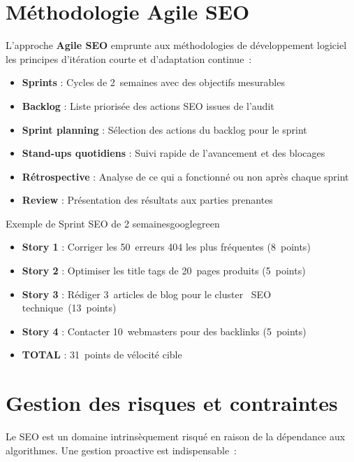 \documentclass[12pt,a4paper,twoside]{report}
\newcommand{\keyword}[1]{\textbf{\textcolor{googleblue}{#1}}}
\begin{document}
\section{Méthodologie Agile SEO}

L'approche \keyword{Agile SEO} emprunte aux méthodologies de développement logiciel les principes d'itération courte et d'adaptation continue~:

\begin{itemize}
    \item \textbf{Sprints} : Cycles de 2~semaines avec des objectifs mesurables
    \item \textbf{Backlog} : Liste priorisée des actions SEO issues de l'audit
    \item \textbf{Sprint planning} : Sélection des actions du backlog pour le sprint
    \item \textbf{Stand-ups quotidiens} : Suivi rapide de l'avancement et des blocages
    \item \textbf{Rétrospective} : Analyse de ce qui a fonctionné ou non après chaque sprint
    \item \textbf{Review} : Présentation des résultats aux parties prenantes
\end{itemize}

\begin{mybox}{Exemple de Sprint SEO de 2 semaines}{googlegreen}
\begin{itemize}
    \item \textbf{Story 1} : Corriger les 50~erreurs 404 les plus fréquentes (8~points)
    \item \textbf{Story 2} : Optimiser les title tags de 20~pages produits (5~points)
    \item \textbf{Story 3} : Rédiger 3~articles de blog pour le cluster \guillemotleft~SEO technique~\guillemotright (13~points)
    \item \textbf{Story 4} : Contacter 10~webmasters pour des backlinks (5~points)
    \item \textbf{TOTAL} : 31~points de vélocité cible
\end{itemize}
\end{mybox}

\section{Gestion des risques et contraintes}

Le SEO est un domaine intrinsèquement risqué en raison de la dépendance aux algorithmes. Une gestion proactive est indispensable~:
\end{document}
